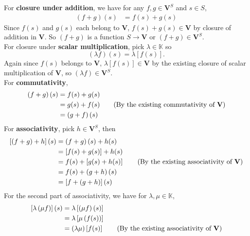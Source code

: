 \begin{solution}
    For \textbf{closure under addition}, we have for any \( f,g \in \mathbf{V}^{S} \) and \( s \in S \), 
    \begin{align*}
      \left( f+g \right)(s) &= f(s) + g(s) 
    \end{align*}
  Since \( f(s) \) and \( g(s) \) each belong to \( \mathbf{V} \), \( f(s) +g(s) \in \mathbf{V} \) by closure of addition in \( \mathbf{V} \). So \( \left( f+g \right) \) is a function \( S \to \mathbf{V} \) or \( \left( f+g \right) \in \mathbf{V}^{S} \). \\ 
  For closure under \textbf{scalar multiplication}, pick \( \lambda \in \mathbb{K} \) so 
  \[ \left( \lambda f\right)(s) = \lambda \left[ f(s) \right] .\]
  Again since \( f(s) \) belongs to \( \mathbf{V} \), \( \lambda \left[ f(s) \right] \in \mathbf{V}  \) by the existing closure of scalar multiplication of \( \mathbf{V} \), so \( \left( \lambda f \right) \in \mathbf{V}^{S} \). \\ 
  For \textbf{commutativity}, 
  \begin{align*}
    \left( f+g \right)(s) &= f(s) + g(s) \\
    &= g(s) +f(s) \tag{By the existing commutativity of $\mathbf{V}$}\\
    &= \left( g+f \right)(s) 
  \end{align*}
   For \textbf{associativity}, pick \( h \in \mathbf{V}^{S} \), then 
   \begin{align*}
    \left[ \left( f+g \right) +h \right](s) &= \left( f+g \right)(s) + h(s) \\
    &= \left[ f(s) + g(s) \right] + h(s) \\
    &= f(s) + \left[ g(s) +h(s) \right] \tag{By the existing associativity of $\mathbf{V}$} \\
    &= f(s) + \left( g+h \right)(s) \\ 
    &= \left[ f + \left( g+h \right) \right](s)
   \end{align*}
   For the second part of associativity, we have for \( \lambda, \mu \in \mathbb{K} \), 
   \begin{align*}
    \left[ \lambda \left( \mu f \right) \right](s) &= \lambda \left[ \left( \mu  f\right)(s) \right] \\
    &= \lambda \left[ \mu \left( f(s) \right) \right] \\
    &= \left( \lambda \mu \right) \left[ f(s) \right] \tag{By the existing associativity of $\mathbf{V}$} \\

\end{align*}
\end{solution}
